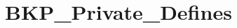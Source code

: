 \hypertarget{group___b_k_p___private___defines}{\section{B\-K\-P\-\_\-\-Private\-\_\-\-Defines}
\label{group___b_k_p___private___defines}
}
